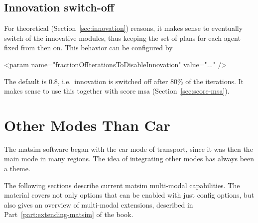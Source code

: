 \subsection{Innovation switch-off}
\label{sec:innovation-switchoff}

For theoretical (Section~\ref{sec:innovation}) reasons, it makes sense to eventually switch of the innovative modules, thus keeping the set of plans for each agent fixed from then on.  This behavior can be configured by
\begin{xml}
   <param name="fractionOfIterationsToDisableInnovation" value="..." />
\end{xml}
The default is 0.8, i.e.\ innovation is switched off after 80\% of the iterations.  It makes sense to use this together with score \gls{msa} (Section~\ref{sec:score-msa}).


\section{Other Modes Than Car}
\label{sec:using-othermodesthancar}




The \gls{matsim} software began with the car mode of transport, since it was then the main mode in many regions. The idea of integrating other modes has always been a theme.

The following sections describe current \gls{matsim} multi-modal capabilities. The material covers not only options that can be enabled with just config options, but also gives an overview of multi-modal extensions, described in Part~\ref{part:extending-matsim} of the book.

